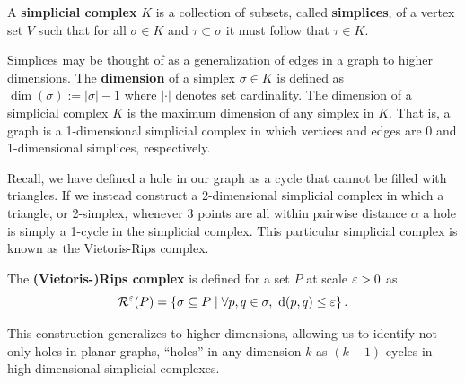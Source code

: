 \begin{definition}
    A \textbf{simplicial complex} $K$ is a collection of subsets, called \textbf{simplices}, of a vertex set $V$ such that for all $\sigma\in K$ and $\tau\subset\sigma$ it must follow that $\tau\in K$.
\end{definition}

Simplices may be thought of as a generalization of edges in a graph to higher dimensions.
The \textbf{dimension} of a simplex $\sigma\in K$ is defined as $\dim(\sigma) := |\sigma|-1$ where $|\cdot|$ denotes set cardinality.
The dimension of a simplicial complex $K$ is the maximum dimension of any simplex in $K$.
That is, a graph is a 1-dimensional simplicial complex in which vertices and edges are 0 and 1-dimensional simplices, respectively.

Recall, we have defined a hole in our graph as a cycle that cannot be filled with triangles.
If we instead construct a 2-dimensional simplicial complex in which a triangle, or 2-simplex, whenever 3 points are all within pairwise distance $\alpha$ a hole is simply a 1-cycle in the simplicial complex.
This particular simplicial complex is known as the Vietoris-Rips complex.
\begin{definition}
    The \textbf{(Vietoris-)Rips complex} is defined for a set $P$ at scale $\varepsilon > 0$ as
    \[ \mathcal{R}^\varepsilon(P) = \left\{\sigma \subseteq P\mid \forall p,q\in\sigma,\ \mathrm{d}(p, q)\leq\varepsilon\right\}. \]
\end{definition}
This construction generalizes to higher dimensions, allowing us to identify not only holes in planar graphs, ``holes'' in any dimension $k$ as $(k-1)$-cycles in high dimensional simplicial complexes.

